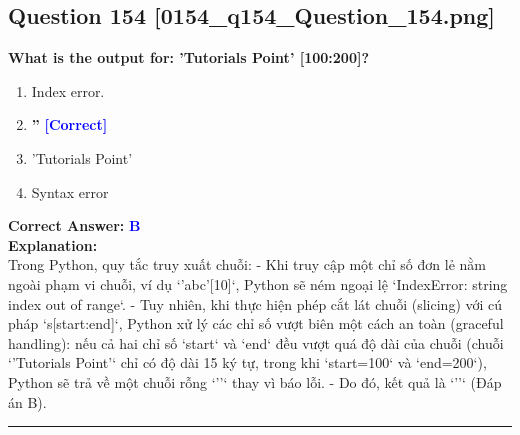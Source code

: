 \documentclass[11pt,a4paper]{article}
\begin{document}
\begin{minipage}{\textwidth}
\subsection*{Question 154 \quad \footnotesize{[0154_q154_Question_154.png]}}
\noindent \textbf{What is the output for: 'Tutorials Point' [100:200]?}

\begin{enumerate}[label=\Alph*.]
    \item Index error.
    \item \textbf{''} \hfill \textcolor{blue}{\textbf{[Correct]}}
    \item 'Tutorials Point'
    \item Syntax error
\end{enumerate}

\noindent \textbf{Correct Answer:} \textcolor{blue}{\textbf{B}} \\[4pt]
\noindent \textbf{Explanation:}\\
Trong Python, quy tắc truy xuất chuỗi:\newline
- Khi truy cập một chỉ số đơn lẻ nằm ngoài phạm vi chuỗi, ví dụ `'abc'[10]`, Python sẽ ném ngoại lệ `IndexError: string index out of range`.\newline
- Tuy nhiên, khi thực hiện phép cắt lát chuỗi (slicing) với cú pháp `s[start:end]`, Python xử lý các chỉ số vượt biên một cách an toàn (graceful handling): nếu cả hai chỉ số `start` và `end` đều vượt quá độ dài của chuỗi (chuỗi `'Tutorials Point'` chỉ có độ dài 15 ký tự, trong khi `start=100` và `end=200`), Python sẽ trả về một chuỗi rỗng `''` thay vì báo lỗi.\newline
- Do đó, kết quả là `''` (Đáp án B).
\end{minipage}
\vspace{0.8cm}
\hrule
\vspace{0.5cm}
\end{document}
